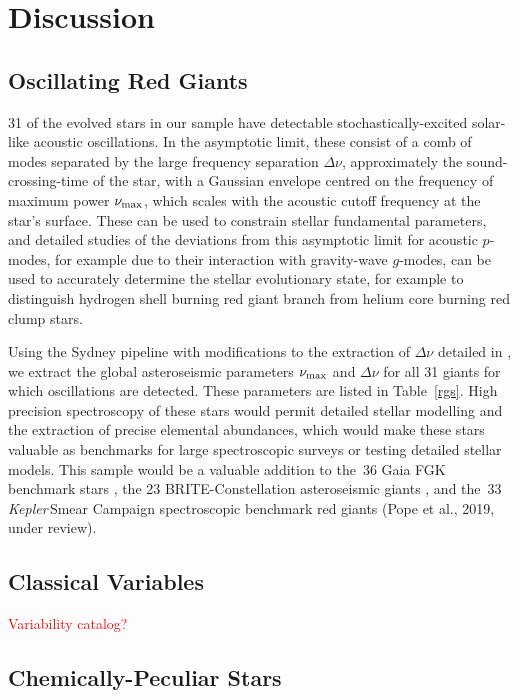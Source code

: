 \documentclass[modern]{aastex62}
\newcommand{\numax}{\mbox{$\nu_{\rm max}$}\xspace}
\newcommand{\Dnu}{\mbox{$\Delta \nu$}\xspace}
\newcommand\kepler{\emph{Kepler}\,}
\begin{document}
\section{Discussion}
\label{sec:discussion}

\subsection{Oscillating Red Giants}
\label{sec:rgs}
31 of the evolved stars in our sample have detectable stochastically-excited solar-like acoustic oscillations. In the asymptotic limit, these consist of a comb of modes separated by the large frequency separation \Dnu, approximately the sound-crossing-time of the star, with a Gaussian envelope centred on the frequency of maximum power \numax, which scales with the acoustic cutoff frequency at the star's surface. These can be used to constrain stellar fundamental parameters, and detailed studies of the deviations from this asymptotic limit for acoustic $p$-modes, for example due to their interaction with gravity-wave $g$-modes, can be used to accurately determine the stellar evolutionary state, for example to distinguish hydrogen shell burning red giant branch from helium core burning red clump stars. 

Using the Sydney pipeline \citep{Huber2009} with modifications to the extraction of \Dnu detailed in \citep{Yu2018}, we extract the global asteroseismic parameters \numax and \Dnu for all 31 giants for which oscillations are detected. These parameters are listed in Table~\ref{rgs}. High precision spectroscopy of these stars would permit detailed stellar modelling and the extraction of precise elemental abundances, which would make these stars valuable as benchmarks for large spectroscopic surveys or testing detailed stellar models. This sample would be a valuable addition to the~36 Gaia FGK benchmark stars \citep{gaiabenchmark1,gaiabenchmark3,2018RNAAS...2c.152J}, the 23 BRITE-Constellation asteroseismic giants \citep{Kallinger2019}, and the~33 \kepler Smear Campaign spectroscopic benchmark red giants (Pope et al., 2019, under review).

\subsection{Classical Variables}
\label{sec:variables}
\textcolor{red}{Variability catalog?}


\subsection{Chemically-Peculiar Stars}
\end{document}
